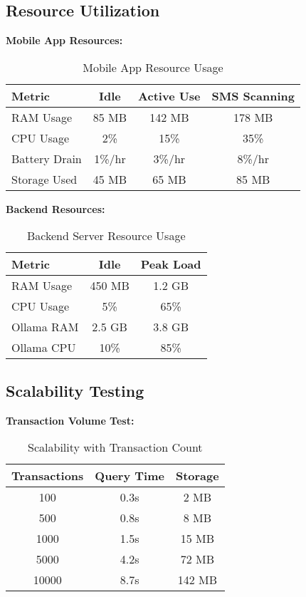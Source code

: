 \documentclass[11pt,a4paper]{report}
\begin{document}
\begin{itemize}
\begin{itemize}
\subsection{Resource Utilization}

\textbf{Mobile App Resources:}
\begin{table}[H]
\centering
\caption{Mobile App Resource Usage}
\begin{tabular}{|l|c|c|c|}
\hline
\textbf{Metric} & \textbf{Idle} & \textbf{Active Use} & \textbf{SMS Scanning} \\
\hline
RAM Usage & 85 MB & 142 MB & 178 MB \\
CPU Usage & 2\% & 15\% & 35\% \\
Battery Drain & 1\%/hr & 3\%/hr & 8\%/hr \\
Storage Used & 45 MB & 65 MB & 85 MB \\
\hline
\end{tabular}
\end{table}

\textbf{Backend Resources:}
\begin{table}[H]
\centering
\caption{Backend Server Resource Usage}
\begin{tabular}{|l|c|c|}
\hline
\textbf{Metric} & \textbf{Idle} & \textbf{Peak Load} \\
\hline
RAM Usage & 450 MB & 1.2 GB \\
CPU Usage & 5\% & 65\% \\
Ollama RAM & 2.5 GB & 3.8 GB \\
Ollama CPU & 10\% & 85\% \\
\hline
\end{tabular}
\end{table}

\subsection{Scalability Testing}

\textbf{Transaction Volume Test:}
\begin{table}[H]
\centering
\caption{Scalability with Transaction Count}
\begin{tabular}{|c|c|c|}
\hline
\textbf{Transactions} & \textbf{Query Time} & \textbf{Storage} \\
\hline
100 & 0.3s & 2 MB \\
500 & 0.8s & 8 MB \\
1000 & 1.5s & 15 MB \\
5000 & 4.2s & 72 MB \\
10000 & 8.7s & 142 MB \\
\hline
\end{tabular}
\end{table}


\end{itemize}
\end{itemize}
\end{document}
